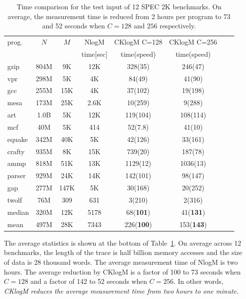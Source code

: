 \begin{table}[h]
\small
\centering
\begin{tabular}{|l|c|c|c|c|c|c|c|}
\hline
prog. & $N$ & $M$ & NlogM & CKlogM C=128  & CKlogM C=256  \\ 
        &     &     & time[sec]  & time(speed) & time(speed) \\ \hline \hline
gzip    & 804M & 9K  & 12K   & 328(35)  & 246(47) \\ \hline
vpr     & 298M & 5K & 4K    & 84(49)  & 41(90) \\ \hline
gcc     & 255M & 15K  & 4K   & 37(102) & 19(198) \\ \hline
mesa    & 173M & 25K  & 2.6K  & 10(259) & 9(288) \\ \hline
art     & 1.0B  & 5K  & 12K   & 119(104) & 108(114) \\ \hline \hline
mcf     & 40M & 5K & 414   & 52(7.8) & 41(10) \\ \hline
equake  & 342M & 40K  & 5K    & 42(126) & 33(161) \\ \hline
crafty  & 935M & 8K & 15K   & 739(20)  & 187(78) \\ \hline
ammp    & 818M & 51K & 13K   & 1129(12)  & 1036(13) \\ \hline
parser  & 929M & 24K & 14K  & 142(101) & 98(147) \\ \hline \hline
gap     & 277M & 147K & 5K    & 30(168) & 20(252) \\ \hline
twolf   & 76M  & 309 & 631   & 3(210) & 2(316) \\ \hline \hline
median  & 320M & 12K & 5178 & 68({\bf 101}) & 41({\bf 131}) \\ \hline
mean    & 497M & 28K & 7343 & 226({\bf 100}) & 153({\bf 143}) \\ \hline
\end{tabular}
\caption{Time comparison for the test input of 12 SPEC 2K benchmarks.  On average, the measurement time is reduced from 2 hours per program to 73 and 52 seconds when $C=128$ and $256$ respectively. }
\label{tbl:all-fp-time-compare}
\end{table}

The average statistics is shown at the bottom of
Table~\ref{tbl:all-fp-time-compare}.  On average across 12 benchmarks, the
length of the trace is half billion memory accesses and the size of
data is 28 thousand words.  The average measurement time of NlogM is
two hours.  The average reduction by CKlogM is a factor of 100 to 73
seconds when $C=128$ and a factor of 142 to 52 seconds when $C=256$.
In other words, \emph{CKlogM reduces the average measurement time from
two hours to one minute.}

